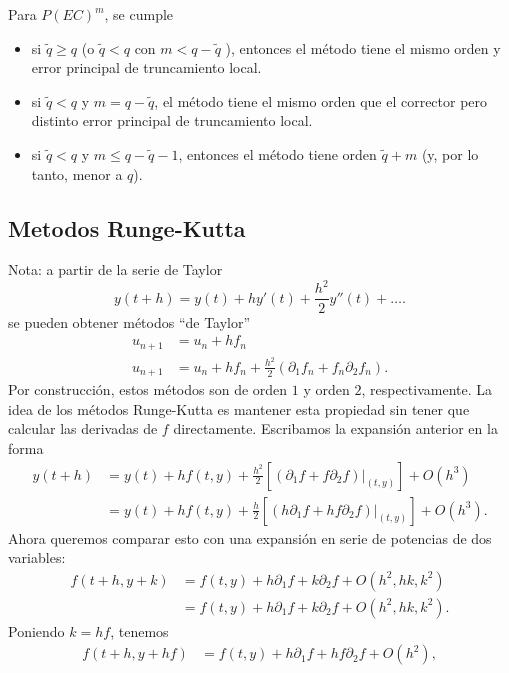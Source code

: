 \documentclass[11pt,letterpaper]{report}
\begin{document}
Para $P(EC)^{m}$, se cumple
\begin{itemize}
  \item
    si $\tilde q\geq q$ (o $\tilde q<q$ con $m<q-\tilde q$ ),
    entonces el método tiene el mismo orden y error principal de
    truncamiento local.
  \item
    si $\tilde q<q$ y $m=q-\tilde q$, el método tiene el mismo orden
    que el corrector pero distinto error principal de truncamiento
    local.
  \item
    si $\tilde q < q$ y $m\leq q-\tilde q - 1$, entonces el método
    tiene orden $\tilde q + m$ (y, por lo tanto, menor a $q$).
\end{itemize}
  

\subsection{Metodos Runge-Kutta}
Nota: a partir de la serie de Taylor
\begin{equation}
  y(t+h) = y(t) + hy'(t) + \frac{h^{2}}{2}y''(t) + \dots
.\end{equation}
se pueden obtener métodos ``de Taylor''
\begin{align}
  u_{n+1} &= u_n + hf_n \\
  u_{n+1} &= u_n
  + hf_n
  + \frac{h^{2}}{2}(\partial_1f_n + f_n \partial_2 f_n)
.\end{align}
Por construcción, estos métodos son de orden $1$ y orden $2$,
respectivamente. La idea de los métodos Runge-Kutta es mantener esta
propiedad sin tener que calcular las derivadas de $f$ directamente.
Escribamos la expansión anterior en la forma
\begin{align}\label{eq:orig}
  y(t+h)
  &= y(t)
    + h f(t,y)
    + \frac{h^{2}}{2}
    \left[ (\partial_1 f + f \partial_2 f)|_{(t,y)} \right]
    + O(h^{3}) \\
  &= y(t)
    + h f(t,y)
    + \frac{h}{2}
    \left[ (h\partial_1 f + h f \partial_2 f)|_{(t,y)} \right]
    + O(h^{3})
.\end{align}
Ahora queremos comparar esto con una expansión en serie de potencias
de dos variables:
\begin{align}
  f(t+h,y+k)
  &=
  f(t,y) + h \partial _1 f + k \partial _2 f + O(h^{2},hk,k^{2})
  \\
  &=
  f(t,y) + h \partial _1 f + k \partial _2 f + O(h^{2},hk,k^{2}).
\end{align}
Poniendo $k=hf$, tenemos
\begin{align}
  f(t+h,y+hf)
  &=
  f(t,y) + h \partial _1 f + hf \partial _2 f
  + O(h^{2}),
\end{align}
\end{document}
